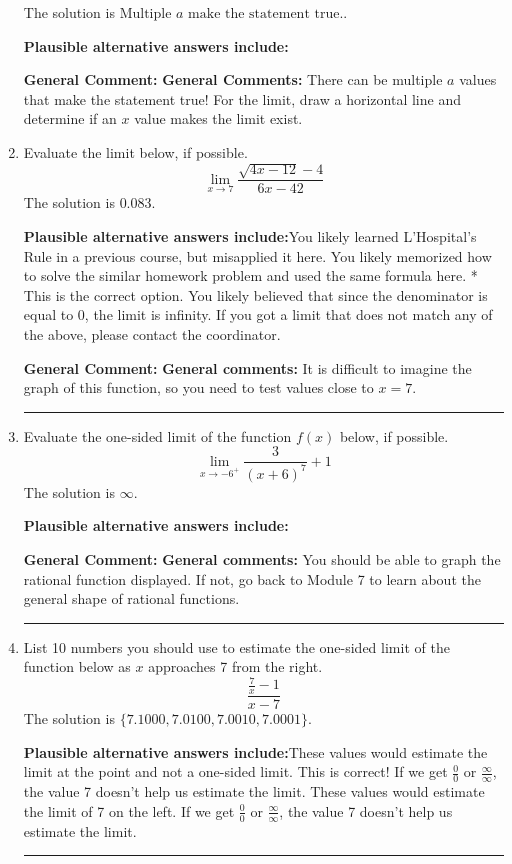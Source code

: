 \documentclass{extbook}[14pt]
\newcommand{\litem}[1]{\item #1

\rule{\textwidth}{0.4pt}}
\begin{document}
\begin{enumerate}
{The solution is \( \text{Multiple } a \text{ make the statement true}. \).\begin{enumerate}[label=\Alph*.]
\textbf{Plausible alternative answers include:}




\end{enumerate}

\textbf{General Comment:} \textbf{General Comments:} There can be multiple $a$ values that make the statement true! For the limit, draw a horizontal line and determine if an $x$ value makes the limit exist.
}
\litem{
Evaluate the limit below, if possible.
\[ \lim_{x \rightarrow 7} \frac{\sqrt{4x - 12} - 4}{6x - 42} \]The solution is \( 0.083 \).\begin{enumerate}[label=\Alph*.]
\textbf{Plausible alternative answers include:}You likely learned L'Hospital's Rule in a previous course, but misapplied it here.
You likely memorized how to solve the similar homework problem and used the same formula here.
* This is the correct option.
You likely believed that since the denominator is equal to 0, the limit is infinity.
If you got a limit that does not match any of the above, please contact the coordinator.
\end{enumerate}

\textbf{General Comment:} \textbf{General comments:} It is difficult to imagine the graph of this function, so you need to test values close to $x = 7$.
}
\litem{
Evaluate the one-sided limit of the function $f(x)$ below, if possible.
\[ \lim_{x \rightarrow -6^+} \frac{3}{(x+6)^7}+1 \]The solution is \( \infty \).\begin{enumerate}[label=\Alph*.]
\textbf{Plausible alternative answers include:}




\end{enumerate}

\textbf{General Comment:} \textbf{General comments:} You should be able to graph the rational function displayed. If not, go back to Module 7 to learn about the general shape of rational functions.
}
\litem{
List 10 numbers you should use to estimate the one-sided limit of the function below as $x$ approaches 7 from the right.
\[ \frac{\frac{7}{x} - 1}{x - 7} \]The solution is \( \{ 7.1000, 7.0100, 7.0010, 7.0001 \} \).\begin{enumerate}[label=\Alph*.]
\textbf{Plausible alternative answers include:}These values would estimate the limit at the point and not a one-sided limit.
This is correct!
If we get $\frac{0}{0}$ or $\frac{\infty}{\infty}$, the value 7 doesn't help us estimate the limit.
These values would estimate the limit of 7 on the left.
If we get $\frac{0}{0}$ or $\frac{\infty}{\infty}$, the value 7 doesn't help us estimate the limit.
\end{enumerate}

}
\end{enumerate}
\end{document}
